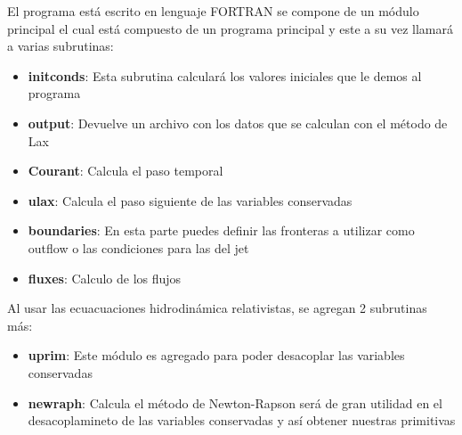 \documentclass[12pt,a4paper]{book}
\begin{document}
El programa está escrito en lenguaje FORTRAN se compone de un módulo principal el cual está compuesto de un programa principal y este a su vez llamará a varias subrutinas:
\begin{itemize}
\item \textbf{initconds}: Esta subrutina calculará los valores iniciales que le demos al programa

\item \textbf{output}: Devuelve un archivo con los datos que se calculan con el método de Lax

\item \textbf{Courant}: Calcula el paso temporal

\item \textbf{ulax}: Calcula el paso siguiente de las variables conservadas

\item \textbf{boundaries}: En esta parte puedes definir las fronteras a utilizar como outflow o las condiciones para las del jet

\item \textbf{fluxes}: Calculo de los flujos
\end{itemize}

Al usar las ecuacuaciones hidrodinámica relativistas, se agregan 2 subrutinas más:

\begin{itemize}
\item \textbf{uprim}: Este módulo es agregado para poder desacoplar las variables conservadas

\item \textbf{newraph}: Calcula el método de Newton-Rapson será de gran utilidad en el desacoplamineto de las variables conservadas y así obtener nuestras primitivas
\end{itemize}
\end{document}
